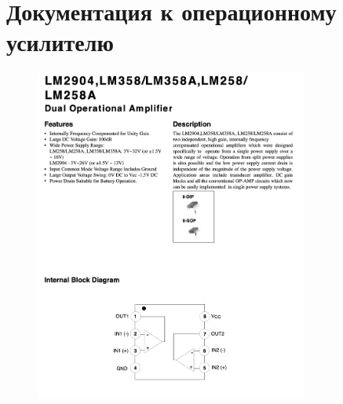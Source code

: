 \documentclass[14pt]{extreport}
\begin{document}
\begin{sloppypar}
\chapter{Документация к операционному усилителю}
\label{appendmult}
\begin{figure}[ht]
	\centering
	\includegraphics[width=0.8\textwidth]{./images/ou.png}
	\label{fig:ou}
\end{figure}



\end{sloppypar}
\end{document}
